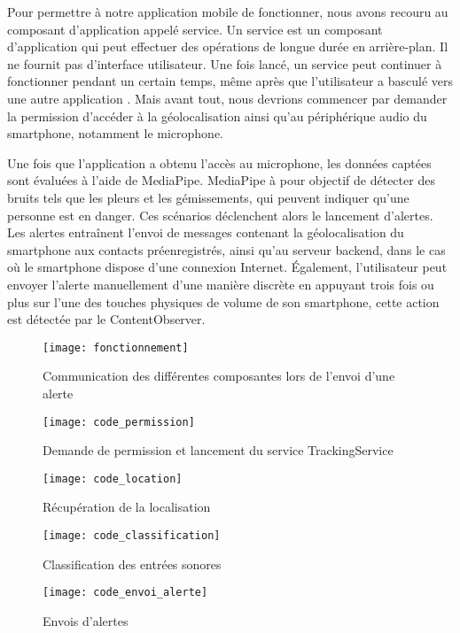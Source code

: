 Pour permettre à notre application mobile de fonctionner, nous avons recouru au composant d’application appelé service. Un service est un composant d'application qui peut effectuer des opérations de longue durée en arrière-plan. Il ne fournit pas d'interface utilisateur. Une fois lancé, un service peut continuer à fonctionner pendant un certain temps, même après que l'utilisateur a basculé vers une autre application \cite{services}. Mais avant tout, nous devrions commencer par demander la permission d'accéder à la géolocalisation ainsi qu'au périphérique audio du smartphone, notamment le microphone.

Une fois que l'application a obtenu l'accès au microphone, les données captées sont évaluées à l'aide de MediaPipe. MediaPipe à pour objectif de détecter des bruits tels que les pleurs et les gémissements, qui peuvent indiquer qu'une personne est en danger. Ces scénarios déclenchent alors le lancement d'alertes. Les alertes entraînent l'envoi de messages contenant la géolocalisation du smartphone aux contacts préenregistrés, ainsi qu'au serveur backend, dans le cas où le smartphone dispose d'une connexion Internet. Également, l'utilisateur peut envoyer l'alerte manuellement d'une manière discrète en appuyant trois fois ou plus sur l'une des touches physiques de volume de son smartphone, cette action est détectée par le ContentObserver\cite{content_observer}.

\begin{figure}[H]
	\centering
	\texttt{[image: fonctionnement]}
	\caption{Communication des différentes composantes lors de l’envoi d’une alerte}
\end{figure}

\begin{figure}[H]
	\centering
	\texttt{[image: code\_permission]}
	\caption{Demande de permission et lancement du service TrackingService}
\end{figure}

\begin{figure}[H]
	\centering
	\texttt{[image: code\_location]}
	\caption{Récupération de la localisation}
\end{figure}

\begin{figure}[H]
	\centering
	\texttt{[image: code\_classification]}
	\caption{Classification des entrées sonores}
\end{figure}

\begin{figure}[H]
	\centering
	\texttt{[image: code\_envoi\_alerte]}
	\caption{Envois d’alertes}
\end{figure}

